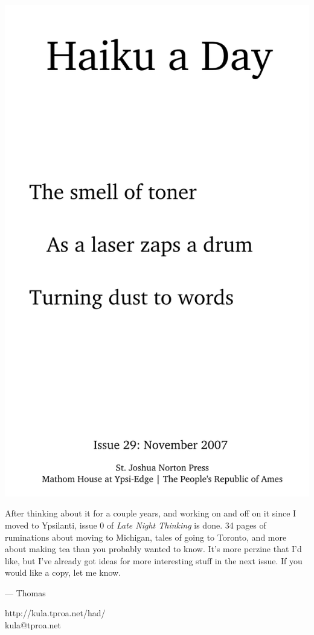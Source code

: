 \documentclass[12pt]{article}
\begin{document}
\includegraphics{frontpage.png}

\newpage

After thinking about it for a couple years, and working on
and off on it since I moved to Ypsilanti, issue 0 of \emph{
Late Night Thinking} is done. 34 pages of ruminations about
moving to Michigan, tales of going to Toronto, and more about
making tea than you probably wanted to know. It's more perzine
that I'd like, but I've already got ideas for more interesting
stuff in the next issue. If you would like a copy, let me know.

--- Thomas

http://kula.tproa.net/had/ \\
kula@tproa.net
\end{document}
